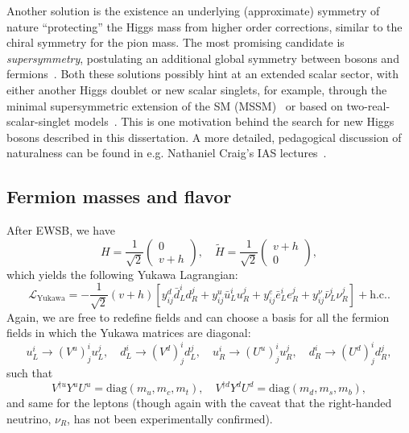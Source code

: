 Another solution is the existence an underlying (approximate) symmetry of nature ``protecting'' the Higgs mass from higher order corrections, similar to the chiral symmetry for the pion mass.
The most promising candidate is \textit{supersymmetry}, postulating an additional global symmetry between bosons and fermions~\cite{Wess:1992cp}.
Both these solutions possibly hint at an extended scalar sector, with either another Higgs doublet or new scalar singlets, for example, through the minimal supersymmetric extension of the SM (MSSM)~\cite{Craig:2013hca} or based on two-real-scalar-singlet models~\cite{Robens:2019kga}.
This is one motivation behind the search for new Higgs bosons described in this dissertation.
A more detailed, pedagogical discussion of naturalness can be found in e.g. Nathaniel Craig's IAS lectures~\cite{Craig:2017Lecture}.


\subsection{Fermion masses and flavor}
\label{sec:01_sm_ew_flavor}

After EWSB, we have
\begin{equation}
	\label{eq:01_sm_ew_higgs_tilde}
	H = \frac{1}{\sqrt{2}} \begin{pmatrix} 0 \\ v + h \end{pmatrix}, \quad
	\tilde H = \frac{1}{\sqrt{2}} \begin{pmatrix} v + h \\ 0 \end{pmatrix},
\end{equation}
which yields the following Yukawa Lagrangian:
\begin{equation}
	\label{eq:01_sm_ew_yukawa_after}
		\mathcal{L}_{\mathrm{Yukawa}} = -\frac{1}{\sqrt{2}}(v + h) \left[y^d_{ij} \bar d^i_L d^j_R + y^u_{ij} \bar u^i_L u^j_R + y^e_{ij} \bar e^i_L e^j_R + y^\nu_{ij} \bar \nu^i_L \nu^j_R\right] + \text{h.c.}.
\end{equation}
Again, we are free to redefine fields and can choose a basis for all the fermion fields in which the Yukawa matrices are diagonal:
\begin{equation}
	\label{eq:01_sm_ew_yukawa_transformation}
	u^i_L \rightarrow (V^u)^i_j u^j_L, \quad d^i_L \rightarrow (V^d)^i_j d^j_L, \quad u^i_R \rightarrow (U^u)^i_j u^j_R, \quad d^i_R \rightarrow (U^d)^i_j d^j_R,
\end{equation}
such that
\begin{equation}
	\label{eq:01_sm_ew_yukawa_diagonal}
	V^{\dagger u} Y^u U^u = \mathrm{diag}(m_u, m_c, m_t), \quad V^{\dagger d} Y^d U^d = \text{diag}(m_d, m_s, m_b),
\end{equation}
and same for the leptons (though again with the caveat that the right-handed neutrino, $\nu_R$, has not been experimentally confirmed).

